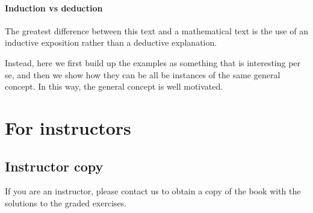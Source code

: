 \paragraph{Induction vs deduction}

The greatest difference between this text and a mathematical text is the use of an inductive exposition rather than a deductive explanation.

Instead, here we first build up the examples as something that is interesting per se, and then we show how they can be all be instances of the same general concept.
In this way, the general concept is well motivated.

\section{For instructors}

\subsection{Instructor copy}
If you are an instructor, please contact us to obtain a copy of the book with the solutions to the graded exercises.


